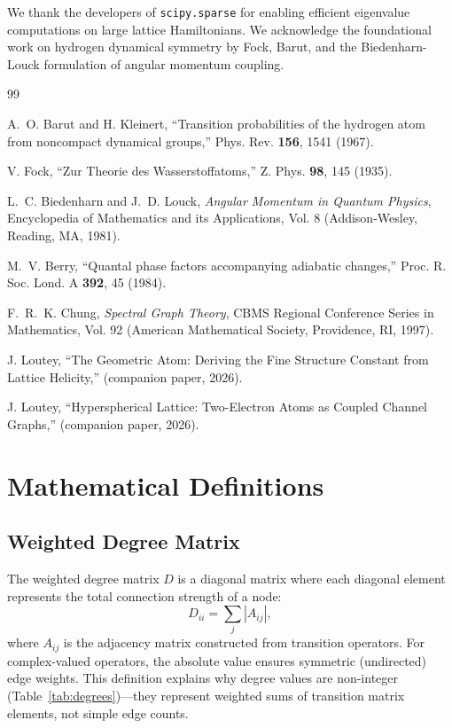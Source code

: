 \documentclass[aps,pra,twocolumn,superscriptaddress,longbibliography]{revtex4-2}
\begin{document}
\begin{acknowledgments}
We thank the developers of \texttt{scipy.sparse} for enabling efficient eigenvalue computations on large lattice Hamiltonians. We acknowledge the foundational work on hydrogen dynamical symmetry by Fock, Barut, and the Biedenharn-Louck formulation of angular momentum coupling.
\end{acknowledgments}

\begin{thebibliography}{99}

A.~O. Barut and H. Kleinert,
``Transition probabilities of the hydrogen atom from noncompact dynamical groups,''
Phys. Rev. \textbf{156}, 1541 (1967).

V. Fock,
``Zur Theorie des Wasserstoffatoms,''
Z. Phys. \textbf{98}, 145 (1935).

L.~C. Biedenharn and J.~D. Louck,
\textit{Angular Momentum in Quantum Physics},
Encyclopedia of Mathematics and its Applications, Vol. 8 (Addison-Wesley, Reading, MA, 1981).

M.~V. Berry,
``Quantal phase factors accompanying adiabatic changes,''
Proc. R. Soc. Lond. A \textbf{392}, 45 (1984).

F.~R.~K. Chung,
\textit{Spectral Graph Theory},
CBMS Regional Conference Series in Mathematics, Vol. 92 (American Mathematical Society, Providence, RI, 1997).

J. Loutey,
``The Geometric Atom: Deriving the Fine Structure Constant from Lattice Helicity,''
(companion paper, 2026).

J. Loutey,
``Hyperspherical Lattice: Two-Electron Atoms as Coupled Channel Graphs,''
(companion paper, 2026).

\end{thebibliography}

\appendix

\section{Mathematical Definitions}
\label{app:berry}

\subsection{Weighted Degree Matrix}

The weighted degree matrix $D$ is a diagonal matrix where each diagonal element represents the total connection strength of a node:
\begin{equation}
D_{ii} = \sum_{j} |A_{ij}|,
\end{equation}
where $A_{ij}$ is the adjacency matrix constructed from transition operators. For complex-valued operators, the absolute value ensures symmetric (undirected) edge weights. This definition explains why degree values are non-integer (Table~\ref{tab:degrees})---they represent weighted sums of transition matrix elements, not simple edge counts.
\end{document}
